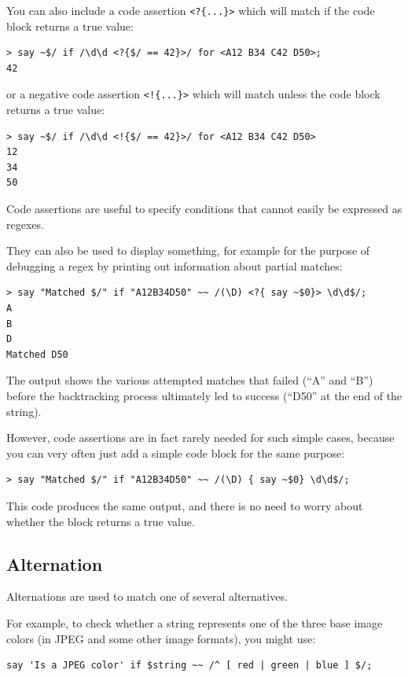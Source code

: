 You can also include a code assertion \verb'<?{...}>' which 
will match if the code block returns a true value:

\begin{verbatim}
> say ~$/ if /\d\d <?{$/ == 42}>/ for <A12 B34 C42 D50>;
42
\end{verbatim}

or a negative code assertion \verb'<!{...}>' which will 
match unless the code block returns a true value:
\begin{verbatim}
> say ~$/ if /\d\d <!{$/ == 42}>/ for <A12 B34 C42 D50>
12
34
50
\end{verbatim}

Code assertions are useful to specify conditions that 
cannot easily be expressed as regexes. 

They can also be used to display something, for example 
for the purpose of debugging a regex by printing out 
information about partial matches:

\begin{verbatim}
> say "Matched $/" if "A12B34D50" ~~ /(\D) <?{ say ~$0}> \d\d$/;
A
B
D
Matched D50
\end{verbatim}

The output shows the various attempted matches that 
failed (``A'' and ``B'') before the backtracking 
process ultimately led to success (``D50'' at the end 
of the string).

However, code assertions are in fact rarely needed for 
such simple cases, because you can very often just add 
a simple code block for the same purpose:
%
\begin{verbatim}
> say "Matched $/" if "A12B34D50" ~~ /(\D) { say ~$0} \d\d$/;
\end{verbatim}
This code produces the same output, and there is no need 
to worry about whether the block returns a true value.


\subsection{Alternation}

Alternations are used to match one of several alternatives.

For example, to check whether a string represents one of the 
three base image colors (in JPEG and some other image formats), 
you might use:

\begin{verbatim}
say 'Is a JPEG color' if $string ~~ /^ [ red | green | blue ] $/;
\end{verbatim}
%

